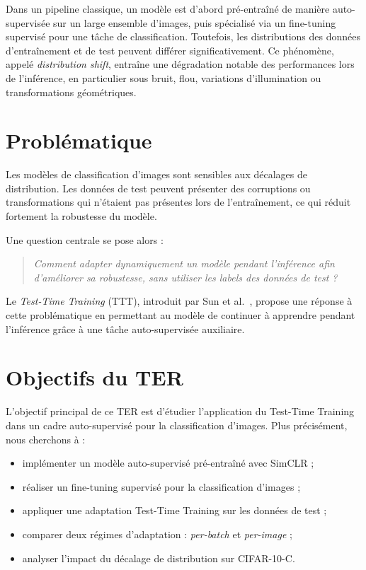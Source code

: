 \documentclass[12pt,a4paper]{report}
\begin{document}
	Dans un pipeline classique, un modèle est d’abord pré-entraîné de manière auto-supervisée sur un large ensemble d’images, puis spécialisé via un fine-tuning supervisé pour une tâche de classification. Toutefois, les distributions des données d’entraînement et de test peuvent différer significativement. Ce phénomène, appelé \emph{distribution shift}, entraîne une dégradation notable des performances lors de l’inférence, en particulier sous bruit, flou, variations d’illumination ou transformations géométriques.
	
	\section{Problématique}
	Les modèles de classification d’images sont sensibles aux décalages de distribution. Les données de test peuvent présenter des corruptions ou transformations qui n’étaient pas présentes lors de l’entraînement, ce qui réduit fortement la robustesse du modèle.
	
	Une question centrale se pose alors :
	
	\begin{quote}
		\textit{Comment adapter dynamiquement un modèle pendant l’inférence afin d’améliorer sa robustesse, sans utiliser les labels des données de test ?}
	\end{quote}
	
	Le \emph{Test-Time Training} (TTT), introduit par Sun et al.~\cite{Sun2020}, propose une réponse à cette problématique en permettant au modèle de continuer à apprendre pendant l’inférence grâce à une tâche auto-supervisée auxiliaire.
	
	\section{Objectifs du TER}
	L’objectif principal de ce TER est d’étudier l’application du Test-Time Training dans un cadre auto-supervisé pour la classification d’images. Plus précisément, nous cherchons à :
	
	\begin{itemize}
		\item implémenter un modèle auto-supervisé pré-entraîné avec SimCLR ;
		\item réaliser un fine-tuning supervisé pour la classification d’images ;
		\item appliquer une adaptation Test-Time Training sur les données de test ;
		\item comparer deux régimes d’adaptation : \emph{per-batch} et \emph{per-image} ;
		\item analyser l’impact du décalage de distribution sur CIFAR-10-C.
	\end{itemize}
	
\end{document}
